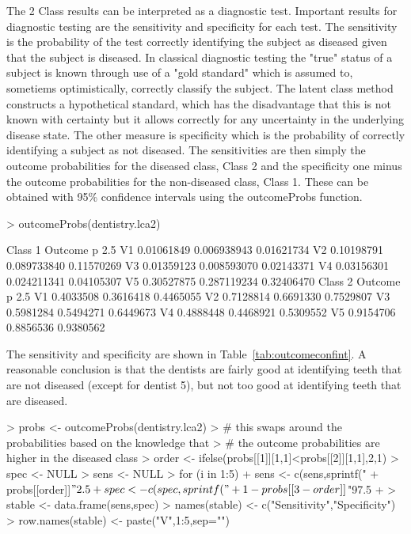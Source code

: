 The 2 Class results can be interpreted as a diagnostic test. Important results for diagnostic testing are the sensitivity and specificity for each test. The sensitivity is the probability of the test correctly identifying the subject as diseased given that the subject is diseased. In classical diagnostic testing the "true" status of a subject is known through use of a "gold standard" which is assumed to, sometiems optimistically, correctly classify the subject. The latent class method constructs a hypothetical standard, which has the disadvantage that this is not known with certainty but it allows correctly for any uncertainty in the underlying disease state. The other measure is specificity which is the probability of correctly identifying a subject as not diseased.
The sensitivities are then simply the outcome probabilities for the diseased class, Class 2 and the specificity one minus the outcome probabilities for the non-diseased class, Class 1. These can be obtained with 95\% confidence intervals using the outcomeProbs function.

\begin{Schunk}
\begin{Sinput}
> outcomeProbs(dentistry.lca2)
\end{Sinput}
\begin{Soutput}
Class  1 
    Outcome p       2.5 %
V1 0.01061849 0.006938943 0.01621734
V2 0.10198791 0.089733840 0.11570269
V3 0.01359123 0.008593070 0.02143371
V4 0.03156301 0.024211341 0.04105307
V5 0.30527875 0.287119234 0.32406470
Class  2 
   Outcome p     2.5 %
V1 0.4033508 0.3616418 0.4465055
V2 0.7128814 0.6691330 0.7529807
V3 0.5981284 0.5494271 0.6449673
V4 0.4888448 0.4468921 0.5309552
V5 0.9154706 0.8856536 0.9380562
\end{Soutput}
\end{Schunk}

The sensitivity and specificity are shown in Table~\ref{tab:outcomeconfint}. A reasonable conclusion is that the dentists are fairly good at identifying teeth that are not diseased (except for dentist 5), but not too good at identifying teeth that are diseased.

\begin{Schunk}
\begin{Sinput}
> probs <- outcomeProbs(dentistry.lca2)
> # this swaps around the probabilities based on the knowledge that
> # the outcome probabilities are higher in the diseased class
> order <- ifelse(probs[[1]][1,1]<probs[[2]][1,1],2,1)
> spec <- NULL
> sens <- NULL
> for (i in 1:5) {
+     sens <- c(sens,sprintf("%
+         probs[[order]]$"2.5 %
+     spec <- c(spec,sprintf("%
+         1-probs[[3-order]]$"97.5 %
+ }
> stable <- data.frame(sens,spec)
> names(stable) <- c("Sensitivity","Specificity")
> row.names(stable) <- paste("V",1:5,sep="")
\end{Sinput}
\end{Schunk}


